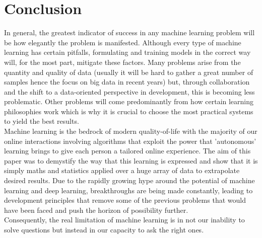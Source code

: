 \documentclass[10pt,a4paper]{report}
\begin{document}
	\chapter{Conclusion}
		In general, the greatest indicator of success in any machine learning problem will be how elegantly the problem is manifested. Although every
		type of machine learning has certain pitfalls, formulating and training models in the correct way will, for the most part, mitigate these factors.
		Many problems arise from the quantity and quality of data (usually it will be hard to gather a great number of samples hence the focus on big data in recent years) but,
		through collaboration and the shift to a data-oriented perspective in development, this is becoming less problematic. Other problems will come predominantly from how certain
		learning philosophies work which is why it is crucial to choose the most practical systems to yield the best results. \\
		Machine learning is the bedrock of modern quality-of-life with the majority of our online interactions involving algorithms that exploit the power that 'autonomous' learning brings
		to give each person a tailored online experience. The aim of this paper was to demystify the way that this learning is expressed and show that it is simply maths and statistics
		applied over a huge array of data to extrapolate desired results. Due to the rapidly growing hype around the potential of machine learning and deep learning, breakthroughs
		are being made constantly, leading to development principles that remove some of the previous problems that would have been faced and push the horizon of possibility further.\\
		Consequently, the real limitation of machine learning is in not our inability to solve questions but instead in our capacity to ask the right ones.

\listoffigures
\printbibliography[title=References]
\end{document}
